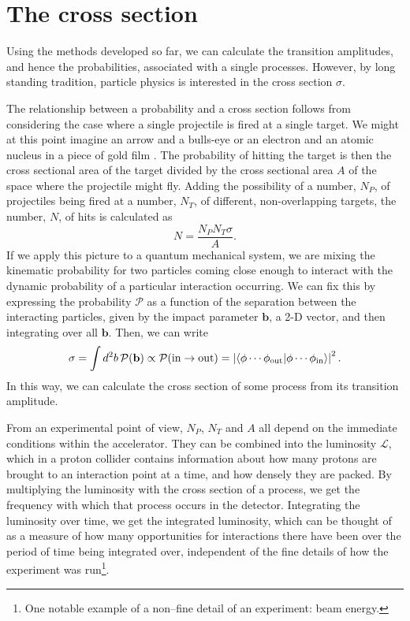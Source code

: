 \section{The cross section}
Using the methods developed so far, we can calculate the transition amplitudes, and hence the probabilities, associated with a single processes. However, by long standing tradition, particle physics is interested in the cross section $\sigma$.

The relationship between a probability and a cross section follows from considering the case where a single projectile is fired at a single target. We might at this point imagine an arrow and a bulls-eye or an electron and an atomic nucleus in a piece of gold film \cite{rutherford}. The probability of hitting the target is then the cross sectional area of the target divided by the cross sectional area $A$ of the space where the projectile might fly. Adding the possibility of a number, $N_P$, of projectiles being fired at a number, $N_T$, of different, non-overlapping targets, the number, $N$, of hits is calculated as
\[N=\frac{N_P N_T \sigma}{A}.\]
If we apply this picture to a quantum mechanical system, we are mixing the kinematic probability for two particles coming close enough to interact with the dynamic probability of a particular interaction occurring. We can fix this by expressing the probability $\mathcal P$ as a function of the separation between the interacting particles, given by the impact parameter $\mathbf b$, a 2-D vector, and then integrating over all $\mathbf b$. Then, we can write
\[\sigma=\int d^2b\,\mathcal P(\mathbf b)\propto\mathcal P(\text{in}\rightarrow\text{out})=\left|\left\langle\phi\cdots\phi_\text{out}\middle|\phi\cdots\phi_\text{in}\right\rangle\right|^2.\]
In this way, we can calculate the cross section of some process from its transition amplitude.

From an experimental point of view, $N_P$, $N_T$ and $A$ all depend on the immediate conditions within the accelerator. They can be combined into the luminosity $\mathscr L$, which in a proton collider contains information about how many protons are brought to an interaction point at a time, and how densely they are packed. By multiplying the luminosity with the cross section of a process, we get the frequency with which that process occurs in the detector. Integrating the luminosity over time, we get the integrated luminosity, which can be thought of as a measure of how many opportunities for interactions there have been over the period of time being integrated over, independent of the fine details of how the experiment was run\footnote{One notable example of a non--fine detail of an experiment: beam energy.}.

